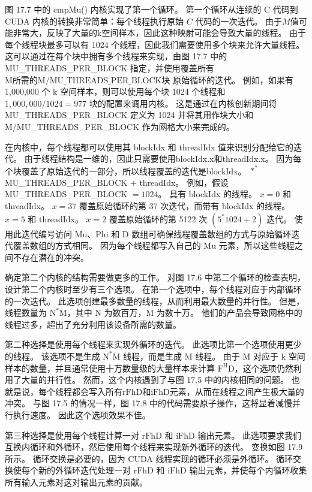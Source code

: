 图 17.7 中的 cmpMu() 内核实现了第一个循环。 第一个循环从连续的 $\mathrm{C}$ 代码到 CUDA 内核的转换非常简单：每个线程执行原始 $C$ 代码的一次迭代。 由于$M$值可能非常大，反映了大量的k空间样本，因此这种映射可能会导致大量的线程。 由于每个线程块最多可以有 1024 个线程，因此我们需要使用多个块来允许大量线程。 这可以通过在每个块中拥有多个线程来实现，由图 17.7 中的 MU\_THREADS\_PER\_BLOCK 指定，并使用覆盖所有 $\mathrm{M 所需的 M/MU\_THREADS\_PER\_BLOCK 块 }$ 原始循环的迭代。 例如，如果有 1,000,000 个 k 空间样本，则可以使用每个块 1024 个线程和 $1,000,000 / 1024=977$ 块的配置来调用内核。 这是通过在内核创新期间将 MU\_THREADS\_PER\_BLOCK 定义为 1024 并将其用作块大小和 M/MU\_THREADS\_PER\_BLOCK 作为网格大小来完成的。

在内核中，每个线程都可以使用其 blockIdx 和 threadIdx 值来识别分配给它的迭代。 由于线程结构是一维的，因此只需要使用blockIdx.x和threadIdx.x。 因为每个块覆盖了原始迭代的一部分，所以线程覆盖的迭代是blockIdx。 $*^{*}$ MU\_THREADS\_PER\_BLOCK + threadIdx。 例如，假设 MU\_THREADS\_PER\_BLOCK $=1024$。 具有 blockIdx 的线程。 $x=0$ 和 threadIdx。 $x=37$ 覆盖原始循环的第 37 次迭代，而带有 blockIdx 的线程。 $x=5$ 和 threadIdx。 $x=2$ 覆盖原始循环的第 5122 次 $\left(5^{*} 1024+2\right)$ 迭代。 使用此迭代编号访问 $\mathrm{Mu}$、Phi 和 D 数组可确保线程覆盖数组的方式与原始循环迭代覆盖数组的方式相同。 因为每个线程都写入自己的 $\mathrm{Mu}$ 元素，所以这些线程之间不存在潜在的冲突。

确定第二个内核的结构需要做更多的工作。 对图 17.6 中第二个循环的检查表明，设计第二个内核时至少有三个选项。 在第一个选项中，每个线程对应于内部循环的一次迭代。 此选项创建最多数量的线程，从而利用最大数量的并行性。 但是，线程数量为 $\mathrm{N}^{*} \mathrm{M}$，其中 $\mathrm{N}$ 为数百万，$\mathrm{M}$ 为数十万。 他们的产品会导致网格中的线程过多，超出了充分利用该设备所需的数量。

第二种选择是使用每个线程来实现外循环的迭代。 此选项比第一个选项使用更少的线程。 该选项不是生成 $\mathrm{N}^{*} \mathrm{M}$ 线程，而是生成 $\mathrm{M}$ 线程。 由于 $\mathrm{M}$ 对应于 k 空间样本的数量，并且通常使用十万数量级的大量样本来计算 $\mathrm{F}^{\mathrm{H} } \mathrm{D}$，这个选项仍然利用了大量的并行性。 然而，这个内核遇到了与图 17.5 中的内核相同的问题。 也就是说，每个线程都会写入所有$\mathrm{rFhD}$和$\mathrm{iFhD}$元素，从而在线程之间产生极大量的冲突。 与图 17.5 的情况一样，图 17.8 中的代码需要原子操作，这将显着减慢并行执行速度。 因此这个选项效果不佳。

第三种选择是使用每个线程计算一对 $\mathrm{rFhD}$ 和 $\mathrm{iFhD}$ 输出元素。 此选项要求我们互换内循环和外循环，然后使用每个线程来实现新外循环的迭代。 变换如图 17.9 所示。 循环交换是必要的，因为 CUDA 线程实现的循环必须是外循环。 循环交换使每个新的外循环迭代处理一对 $\mathrm{rFhD}$ 和 $\mathrm{iFhD}$ 输出元素，并使每个内循环收集所有输入元素对这对输出元素的贡献。

